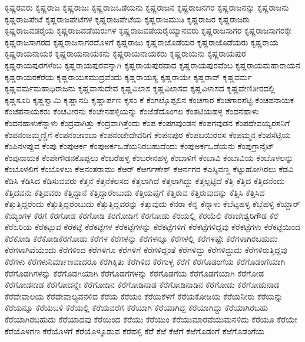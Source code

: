 {ಕೃಷ್ಣರವರು
ಕೃಷ್ಣರಾಜ
ಕೃಷ್ಣರಾಜಃ
ಕೃಷ್ಣರಾಜಒಡೆಯನು
ಕೃಷ್ಣರಾಜನ
ಕೃಷ್ಣರಾಜನಗರ
ಕೃಷ್ಣರಾಜನನ್ನು
ಕೃಷ್ಣರಾಜನು
ಕೃಷ್ಣರಾಜಪೇಟೆ
ಕೃಷ್ಣರಾಜಪೇಟೆಗಳ
ಕೃಷ್ಣರಾಜಪೇಟೆಯ
ಕೃಷ್ಣರಾಜಮುಡಿ
ಕೃಷ್ಣರಾಜರ
ಕೃಷ್ಣರಾಜರು
ಕೃಷ್ಣರಾಜವಡರೈಯ
ಕೃಷ್ಣರಾಜವಡೆಯರುಗಳ
ಕೃಷ್ಣರಾಜವಡೆಯರೈಯ್ಯಾನವರು
ಕೃಷ್ಣರಾಜಸಾಗರ
ಕೃಷ್ಣರಾಜಸಾಗರಕ್ಕೇ
ಕೃಷ್ಣರಾಜಸಾಗರದ
ಕೃಷ್ಣರಾಜಸಾಗರದೊಳಗೆ
ಕೃಷ್ಣರಾಜು
ಕೃಷ್ಣರಾಜೊಡೆಯರ
ಕೃಷ್ಣರಾಜೊಡೆಯರು
ಕೃಷ್ಣರಾಯ
ಕೃಷ್ಣರಾಯನಾಯಕ
ಕೃಷ್ಣರಾಯನಾಯಕನು
ಕೃಷ್ಣರಾಯನಾಯಕರು
ಕೃಷ್ಣರಾಯನು
ಕೃಷ್ಣರಾಯಪುರ
ಕೃಷ್ಣರಾಯಪುರಗಳೆಂಬ
ಕೃಷ್ಣರಾಯಪುರವನ್ನಾಗಿ
ಕೃಷ್ಣರಾಯಪುರವಾದ
ಕೃಷ್ಣರಾಯಪುರವೆಂಬ
ಕೃಷ್ಣರಾಯಮಹಾರಾಯನ
ಕೃಷ್ಣರಾಯರಕೆರೆಯ
ಕೃಷ್ಣರಾಯಸಮುದ್ರವೆಂದು
ಕೃಷ್ಣರಾಯಸ್ಯ
ಕೃಷ್ಣರಾಯೇ
ಕೃಷ್ಣರಾವ್
ಕೃಷ್ಣವರ್ಮ
ಕೃಷ್ಣವರ್ಮಮಹಾಧಿರಾಜನು
ಕೃಷ್ಣವಾಸುದೇವ
ಕೃಷ್ಣವಿಲಾಸ
ಕೃಷ್ಣವಿಲಾಸದ
ಕೃಷ್ಣವಿಳಾಸದ
ಕೃಷ್ಣವೇಣಿತೀರದಲ್ಲಿ
ಕೃಷ್ಣಸೂರಿ
ಕೃಷ್ಣಸ್ವಾಮಿ
ಕೃಷ್ಣಾನದಿ
ಕೃಷ್ಣಾರ್ಪಣ
ಕೃಸಂ
ಕೆ
ಕೆಂಗಲ್ಕೊಪ್ಪಲಿನ
ಕೆಂಚಗಾರ
ಕೆಂಚಗಾರಸೆಟ್ಟಿ
ಕೆಂಚಪನಾಯಕ
ಕೆಂಚಪನಾಯಕರು
ಕೆಂಚವೀರನು
ಕೆಂಚೇನಹಳ್ಳಿಯನ್ನು
ಕೆಂಜೆಡೆದೊಂಗಲ
ಕೆಂತಟಿಯಹಳ್ಳ
ಕೆಂದನಹಾಳು
ಕೆಂದನಹಾಳುಕೆನ್ನಾಳು
ಕೆಂದ್ರವಾಗಿತ್ತು
ಕೆಂದ್ರವಾಗಿತ್ತೆಂದು
ಕೆಂಪ
ಕೆಂಪಗವುಂಡನ
ಕೆಂಪಗವುಡನ
ಕೆಂಪದೇವಯ್ಯರಸನಿಗೆ
ಕೆಂಪನಂಜಮ್ಮಣ್ಣಿಗೆ
ಕೆಂಪನಂಜಾಂಬಾ
ಕೆಂಪನಂಜೇದೇವರಿಗೆ
ಕೆಂಪನಪುರ
ಕೆಂಪಬಯಿರರಸ
ಕೆಂಪಮ್ಮನ
ಕೆಂಪಸೆಟ್ಟಿಯ
ಕೆಂಪಿನಳಪ್ಪುವ
ಕೆಂಪು
ಕೆಂಪುಅರ್ಕ
ಕೆಂಪುಅರ್ಕಒಡೆಯನಿರಬಹುದೆಂದು
ಕೆಂಪುಅರ್ಕಒಡೆಯನು
ಕೆಂಪುಗ್ರಾನೈಟ್
ಕೆಂಪುನಾಯಕ
ಕೆಂಪೇಗೌಡನಕೊಪ್ಪಲು
ಕೆಂಬರೆಹಳ್ಳ
ಕೆಂಬರೇನಹಳ್ಳ
ಕೆಂಬಾಳಿಗೆ
ಕೆಂಬಾವಿ
ಕೆಂಬಾವಿಯ
ಕೆಂಬೊಳಲನ್ನು
ಕೆಂಬೊಳಲಿಗೆ
ಕೆಂಬೊಳಲು
ಕೆಅನಂತರಾಮು
ಕೆಆರ್
ಕೆಆರ್ಗಣೇಶ್
ಕೆಆರ್ನಗರ
ಕೆಎಸ್ಶಿವಣ್ಣ
ಕೆಟ್ಟುಹೋಗಿರಲು
ಕೆಡವಿ
ಕೆಡಿಸಿ
ಕೆಡಿಸಿದ
ಕೆಡಿಸುವವರು
ಕೆತ್ತನೆ
ಕೆತ್ತನೆಕೆಲಸದ
ಕೆತ್ತಲಾಗಿದೆ
ಕೆತ್ತಲಾಗಿದ್ದು
ಕೆತ್ತಲ್ಪಟ್ಟಿದೆ
ಕೆತ್ತಿ
ಕೆತ್ತಿದ
ಕೆತ್ತಿದನೆಂದು
ಕೆತ್ತಿದವನು
ಕೆತ್ತಿದವರು
ಕೆತ್ತಿದ್ದಾನೆ
ಕೆತ್ತಿದ್ದಾರೆಂಬುದು
ಕೆತ್ತಿಯಪ್ಪಗೆ
ಕೆತ್ತಿರುವ
ಕೆತ್ತಿರುವುದನ್ನು
ಕೆತ್ತಿಸಿ
ಕೆತ್ತಿಸಿದ
ಕೆತ್ತುತ್ತಿದ್ದರೆಂದು
ಕೆತ್ತುತ್ತಿದ್ದರೆಂಬುದು
ಕೆತ್ತುತ್ತಿದ್ದವರನ್ನು
ಕೆತ್ತುವುದು
ಕೆನರಾ
ಕೆನ್ನ
ಕೆನ್ನಾಳು
ಕೆಬೆಟ್ಟಹಳ್ಳಿ
ಕೆಬ್ಬೆಹಳ್ಳಿ
ಕೆಯ್ದಾರ್
ಕೆಯ್ಯಂಗಳ
ಕೆರಗೆ
ಕೆರಗೋಡ
ಕೆರಗೋಡಿ
ಕೆರಗೋಡಿಗೆ
ಕೆರಗೋಡು
ಕೆರಯಲ್ಲಿ
ಕೆರಯೆಲಿ
ಕೆರಾಜೇಶ್ವರಿಗೌಡ
ಕೆರೆ
ಕೆರೆಏರಿಯ
ಕೆರೆಕಟ್ಟುವ
ಕೆರೆಕಟ್ಟೆ
ಕೆರೆಕಟ್ಟೆಗಳ
ಕೆರೆಕಟ್ಟೆಗಳನ್ನು
ಕೆರೆಕಟ್ಟೆಗಳಿಗೆ
ಕೆರೆಕಟ್ಟೆಗಳಿದ್ದವು
ಕೆರೆಕಟ್ಟೆಗಳು
ಕೆರೆಕಟ್ಟೆಯಿಂದ
ಕೆರೆಕೋಡಿ
ಕೆರೆಕೋಡಿಕೆರಗೋಡು
ಕೆರೆಗಳ
ಕೆರೆಗಳನ್ನು
ಕೆರೆಗಳನ್ನೂ
ಕೆರೆಗಳಲ್ಲಿ
ಕೆರೆಗಳಷ್ಟೇ
ಕೆರೆಗಳಾಗಿರಬಹುದು
ಕೆರೆಗಳಾಗಿವೆಯೆಂದು
ಕೆರೆಗಳಿಂದ
ಕೆರೆಗಳಿಗೂ
ಕೆರೆಗಳಿಗೆ
ಕೆರೆಗಳಿದ್ದಂತೆ
ಕೆರೆಗಳಿದ್ದು
ಕೆರೆಗಳಿದ್ದುದು
ಕೆರೆಗಳಿರುತ್ತಿದ್ದವು
ಕೆರೆಗಳು
ಕೆರೆಗಳುನಿರ್ಮಾಣವಾದರೂ
ಕೆರೆಗಿಕ್ಕಿತು
ಕೆರೆಗಿಳಿದ
ಕೆರೆಗುಳ್ಳ
ಕೆರೆಗೆ
ಕೆರೆಗೊಡಂಗೆಯ
ಕೆರೆಗೊಡಂಗೆಯಾಗಿ
ಕೆರೆಗೊಡಗಿಗಳನ್ನು
ಕೆರೆಗೊಡಗಿಯಾಗಿ
ಕೆರೆಗೊಡಗೆಗಳನ್ನು
ಕೆರೆಗೊಡಗೆಯ
ಕೆರೆಗೊಡಗೆಯಾಗಿ
ಕೆರೆಗೋಡ
ಕೆರೆಗೋಡನಾಡ
ಕೆರೆಗೋಡನ್ನೇ
ಕೆರೆಗೋಡಿನ
ಕೆರೆಗೋಡಿನಾಡ
ಕೆರೆಗೋಡಿನಾಡಿನ
ಕೆರೆಗೋಡು
ಕೆರೆಗೋಡುನಾಡ
ಕೆರೆದೇವಾಲಯ
ಕೆರೆದೇವಾಲ್ಯವನಳಿದ
ಕೆರೆಯ
ಕೆರೆಯಂ
ಕೆರೆಯಕೆಳಗೆ
ಕೆರೆಯಕೋಡಿಯ
ಕೆರೆಯನೀರು
ಕೆರೆಯನ್ನು
ಕೆರೆಯನ್ನೂ
ಕೆರೆಯಬಳಿ
ಕೆರೆಯಲ್ಲಿ
ಕೆರೆಯವರೆಗೆ
ಕೆರೆಯಾಗಿ
ಕೆರೆಯಾಗಿದ್ದ
ಕೆರೆಯಾಗಿದ್ದು
ಕೆರೆಯಾಗಿರಬಹು
ಕೆರೆಯಾಗಿರಬಹುದು
ಕೆರೆಯಾದವು
ಕೆರೆಯಿಂದ
ಕೆರೆಯು
ಕೆರೆಯುಂ
ಕೆರೆಯುಮಾರವೆಯುಮನಳಿದು
ಕೆರೆಯೂ
ಕೆರೆಯೇ
ಕೆರೆಯೊಳಗಣ
ಕೆರೆಯೊಳಗೆ
ಕೆರೆಯೊಳ್ಕೂಡುವ
ಕೆರೆಹಳ್ಳಿ
ಕೆರೆೆ
ಕೆಱೆ
ಕೆಱೆಗೆ
ಕೆಱೆಗೊಡಂಗೆ
ಕೆಱೆಗೊಡಂಗೆಯ
}
